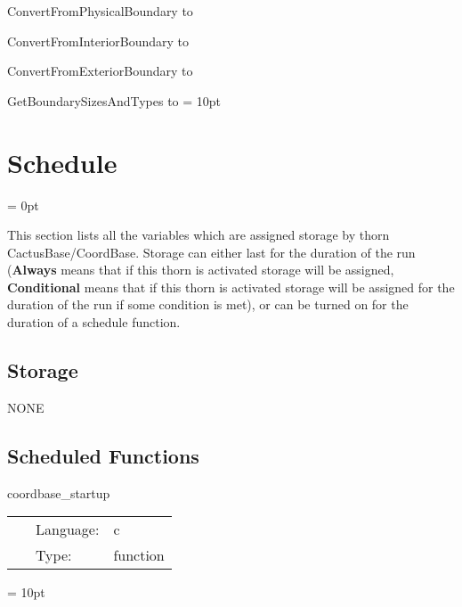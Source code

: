 ConvertFromPhysicalBoundary to 

ConvertFromInteriorBoundary to 

ConvertFromExteriorBoundary to 

GetBoundarySizesAndTypes to 
\vspace{2mm}\parskip = 10pt 

\section{Schedule} 


\parskip = 0pt


\noindent This section lists all the variables which are assigned storage by thorn CactusBase/CoordBase.  Storage can either last for the duration of the run ({\bf Always} means that if this thorn is activated storage will be assigned, {\bf Conditional} means that if this thorn is activated storage will be assigned for the duration of the run if some condition is met), or can be turned on for the duration of a schedule function.


\subsection*{Storage}NONE
\subsection*{Scheduled Functions}
\vspace{5mm}


\hspace{5mm} coordbase\_startup 

\hspace{5mm}{\it register a gh extension to store the coordinate system handles } 


\hspace{5mm}

 \begin{tabular*}{160mm}{cll} 
~ & Language:  & c \\ 
~ & Type:  & function \\ 
\end{tabular*} 



\vspace{5mm}\parskip = 10pt 

